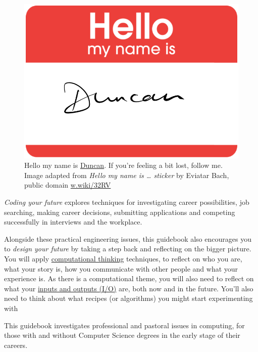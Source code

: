 \documentclass[
]{book}
\begin{document}
\begin{figure}

{\centering \includegraphics[width=0.89\linewidth]{images/Hello-my-name-is-Duncan} 

}

\caption{Hello my name is \href{https://en.wikipedia.org/wiki/Duncan_(given_name)}{Duncan}. If you're feeling a bit lost, follow me. Image adapted from \emph{Hello my name is \ldots{} sticker} by Eviatar Bach, public domain \href{https://w.wiki/32RV}{w.wiki/32RV}}\label{fig:hello-my-name-fig}
\end{figure}



\emph{Coding your future} explores techniques for investigating career possibilities, job searching, making career decisions, submitting applications and competing successfully in interviews and the workplace.

Alongside these practical engineering issues, this guidebook also encourages you to \emph{design your future} by taking a step back and reflecting on the bigger picture. You will apply \href{https://en.wikipedia.org/wiki/Computational_thinking}{computational thinking} techniques, to reflect on who you are, what your story is, how you communicate with other people and what your experience is. As there is a computational theme, you will also need to reflect on what your \href{https://en.wikipedia.org/wiki/Input/output}{inputs and outputs (I/O)} are, both now and in the future. You'll also need to think about what recipes (or algorithms) you might start experimenting with

This guidebook investigates professional and pastoral issues in computing, for those with and without Computer Science degrees in the early stage of their careers.
\end{document}

